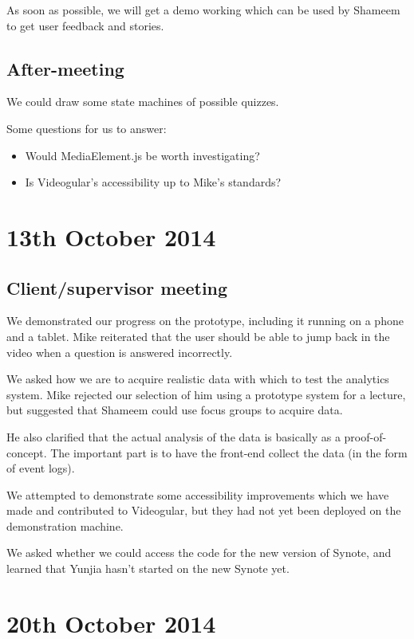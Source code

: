 As soon as possible, we will get a demo working which can be used by
Shameem to get user feedback and stories.

\subsection{After-meeting}

We could draw some state machines of possible quizzes.

Some questions for us to answer:

\begin{itemize}
\itemsep1pt\parskip0pt
\item
  Would MediaElement.js be worth investigating?
\item
  Is Videogular's accessibility up to Mike's standards?
\end{itemize}

\section{13th October 2014}\label{Minutes:2014-10-13}

\subsection{Client/supervisor meeting}

We demonstrated our progress on the prototype, including it running on a
phone and a tablet. Mike reiterated that the user should be able to jump
back in the video when a question is answered incorrectly.

We asked how we are to acquire realistic data with which to test the
analytics system. Mike rejected our selection of him using a prototype
system for a lecture, but suggested that Shameem could use focus groups
to acquire data.

He also clarified that the actual analysis of the data is basically as a
proof-of-concept. The important part is to have the front-end collect
the data (in the form of event logs).

We attempted to demonstrate some accessibility improvements which we
have made and contributed to Videogular, but they had not yet been
deployed on the demonstration machine.

We asked whether we could access the code for the new version of Synote,
and learned that Yunjia hasn't started on the new Synote yet.

\section{20th October 2014}\label{Minutes:2014-10-20}

